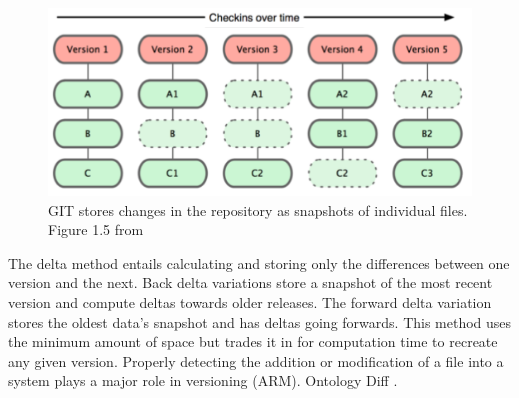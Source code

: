 \begin{figure}
	\centering
	\includegraphics[scale=0.50]{figures/GITFiles.png}
	\caption[GIT stores changes in the repository as snapshots of individual files.]{GIT stores changes in the repository as snapshots of individual files. Figure 1.5 from \cite{Chacon:2009:PG:1618548}}
	\label{GITFile}
\end{figure}

The delta method entails calculating and storing only the differences between one version and the next.
Back delta variations store a snapshot of the most recent version and compute deltas towards older releases.
The forward delta variation stores the oldest data's snapshot and has deltas going forwards.
This method uses the minimum amount of space but trades it in for computation time to recreate any given version.
Properly detecting the addition or modification of a file into a system plays a major role in versioning (ARM)\cite{6906868}.
Ontology Diff \cite{Hartung201315}.



